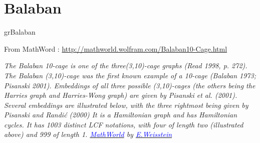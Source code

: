 \newpage\section{Balaban}\label{balaban}

\begin{NewMacroBox}{grBalaban}{}

\medskip
From MathWord : \url{http://mathworld.wolfram.com/Balaban10-Cage.html} 

\emph{The Balaban 10-cage is one of the three(3,10)-cage graphs (Read 1998, p. 272). The Balaban (3,10)-cage was the first known example of a 10-cage (Balaban 1973; Pisanski 2001). Embeddings of all three possible (3,10)-cages (the others being the Harries graph and Harries-Wong graph) are given by Pisanski et al. (2001). Several embeddings are illustrated below, with the three rightmost being given by Pisanski and Randić (2000)
It is a Hamiltonian graph and has  Hamiltonian cycles. It has 1003 distinct LCF notations, with four of length two (illustrated above) and 999 of length 1.
\href{http://mathworld.wolfram.com/topics/GraphTheory.html}%
           {\textcolor{blue}{MathWorld}} by \href{http://en.wikipedia.org/wiki/Eric_W._Weisstein}%
           {\textcolor{blue}{E.Weisstein}}
}
\end{NewMacroBox}

\subsection{}
\begin{center}
\begin{tkzexample}[vbox]
\end{tkzexample}

\end{center}


\vfill\newpage
\subsection{}
\begin{center}
\begin{tkzexample}[vbox]
\end{tkzexample}

\end{center}

